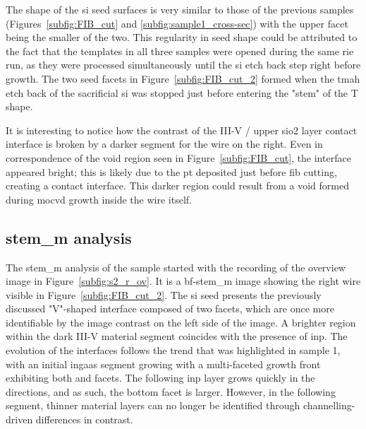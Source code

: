 The shape of the \acl{si} seed surfaces is very similar to those of the previous samples (Figures~\ref{subfig:FIB_cut} and \ref{subfig:sample1_cross-sec}) with the upper  facet being the smaller of the two. This regularity in seed shape could be attributed to the fact that the templates in all three samples were opened during the same \acf{rie} run, as they were processed simultaneously until the \acl{si} etch back step right before growth. The two seed facets in Figure~\ref{subfig:FIB_cut_2} formed when the \acs{tmah} etch back of the sacrificial \acl{si} was stopped just before entering the "stem" of the T shape. 

It is interesting to notice how the contrast of the III-V / upper \acs{sio2} layer contact interface is broken by a darker segment for the wire on the right. Even in correspondence of the void region seen in Figure~\ref{subfig:FIB_cut}, the interface appeared bright; this is likely due to the \acl{pt} deposited just before \acs{fib} cutting, creating a contact interface. This darker region could result from a void formed during \acs{mocvd} growth inside the wire itself.

\subsection{\texorpdfstring{\acs{stem_m} analysis}{STEM analysis}}

The \acs{stem_m} analysis of the sample started with the recording of the overview image in Figure~\ref{subfig:s2_r_ov}. It is a \acs{bf}-\acs{stem_m} image showing the right wire visible in Figure~\ref{subfig:FIB_cut_2}. The \acl{si} seed presents the previously discussed "V"-shaped interface composed of two  facets, which are once more identifiable by the image contrast on the left side of the image. A brighter region within the dark III-V material segment coincides with the presence of \acs{inp}. The evolution of the interfaces follows the trend that was highlighted in sample 1, with an initial \acs{ingaas} segment growing with a multi-faceted growth front exhibiting both  and  facets. The following \acs{inp} layer grows quickly in the  directions, and as such, the bottom  facet is larger. However, in the following segment, thinner material layers can no longer be identified through channelling-driven differences in contrast.

